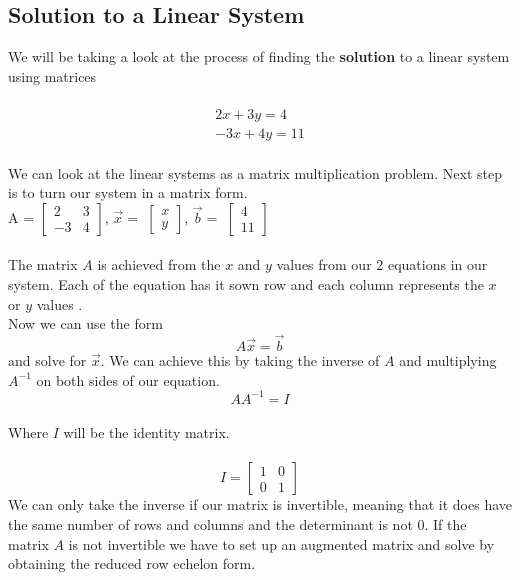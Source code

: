 \documentclass[12pt]{article}
\begin{document}
\subsection{Solution to a Linear System}
We will be taking a look at the process of finding the \textbf{solution} to a linear system using matrices\\\\
\bigskip
\begin{align*}
2x+3y=4 \\
-3x+4y=11 
\end{align*}
\medskip
\\We can look at the linear systems as a matrix multiplication problem. Next step is to turn our system in a matrix form. \\
\bigskip
\newline
A = $\begin{bmatrix}
  2 & 3 \\
  -3 & 4
\end{bmatrix}$, $\vec{x}=$ $\begin{bmatrix} 
  x \\
  y
\end{bmatrix}$, $\vec{b} =$ $\begin{bmatrix}
  4 \\
  11
\end{bmatrix}$
\\\\ The matrix $A$ is achieved from the $x$ and $y$ values from our 2 equations in our system. Each of the equation has it sown row and each column represents the $x$ or $y$ values .
\newline
\\
Now we can use the form $$A\vec{x} = \vec{b}$$
and solve for $\vec{x}$. We can achieve this by taking the inverse of $A$ and multiplying $A^{-1}$ on both sides of our equation.
\begin{equation*}
AA^{-1}=I
\end{equation*}
\\Where $I$ will be the identity matrix.
\\\\ 
\begin{equation*}
I = \begin{bmatrix}1 & 0 \\ 0 & 1\end{bmatrix}
\end{equation*}
 We can only take the inverse if our matrix is invertible, meaning that it does have the same number of rows and columns and the determinant is not 0. If the matrix $A$ is not invertible we have to set up an augmented matrix and solve by obtaining the reduced row echelon form. 
\end{document}
